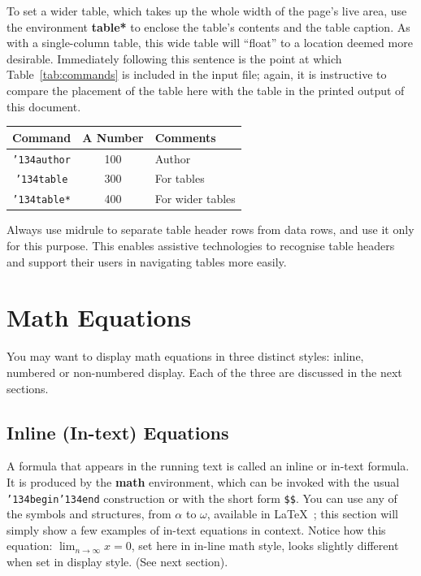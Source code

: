 \documentclass[
acmsmall,
nonacm,
screen,
acmthm]{../templates/acmart}
\makeatletter
\newcounter{tableno}
\newenvironment{tablenos:no-prefix-table-caption}{
  \caption@ifcompatibility{}{
    \let\oldthetable\thetable
    \let\oldtheHtable\theHtable
    \renewcommand{\thetable}{tableno:\thetableno}
    \renewcommand{\theHtable}{tableno:\thetableno}
    \stepcounter{tableno}
    \captionsetup{labelformat=empty}
  }
}{
  \caption@ifcompatibility{}{
    \captionsetup{labelformat=default}
    \let\thetable\oldthetable
    \let\theHtable\oldtheHtable
    \addtocounter{table}{-1}
  }
}
\makeatother
\begin{document}
To set a wider table, which takes up the whole width of the page's live
area, use the environment \textbf{table*} to enclose the table's
contents and the table caption. As with a single-column table, this wide
table will ``float'' to a location deemed more desirable. Immediately
following this sentence is the point at which
Table~\protect\hyperlink{tab:commands}{{[}tab:commands{]}} is included
in the input file; again, it is instructive to compare the placement of
the table here with the table in the printed output of this document.

\begin{tablenos:no-prefix-table-caption}

\begin{longtable}[]{@{}ccl@{}}
\toprule
Command & A Number & Comments \\
\midrule
\endhead
\texttt{’134author} & 100 & Author \\
\texttt{’134table} & 300 & For tables \\
\texttt{’134table*} & 400 & For wider tables \\
\bottomrule
\end{longtable}

\end{tablenos:no-prefix-table-caption}

Always use midrule to separate table header rows from data rows, and use
it only for this purpose. This enables assistive technologies to
recognise table headers and support their users in navigating tables
more easily.

\hypertarget{math-equations}{%
\section{Math Equations}\label{math-equations}}

You may want to display math equations in three distinct styles: inline,
numbered or non-numbered display. Each of the three are discussed in the
next sections.

\hypertarget{inline-in-text-equations}{%
\subsection{Inline (In-text) Equations}\label{inline-in-text-equations}}

A formula that appears in the running text is called an inline or
in-text formula. It is produced by the \textbf{math} environment, which
can be invoked with the usual \texttt{’134begin’134end} construction or
with the short form \texttt{\$\$}. You can use any of the symbols and
structures, from \(\alpha\) to \(\omega\), available in
LaTeX~\citep{Lamport:LaTeX}; this section will simply show a few
examples of in-text equations in context. Notice how this equation:
\(\lim_{n\rightarrow \infty}x=0\), set here in in-line math style, looks
slightly different when set in display style. (See next section).
\end{document}
